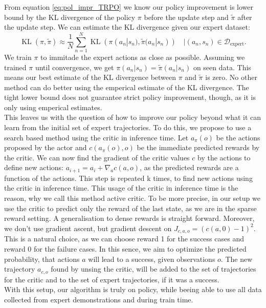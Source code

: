 From equation \ref{eq:pol_impr_TRPO} we know our policy improvement is lower bound by the KL divergence of the policy $\pi$ before the update step and 
$\tilde{\pi}$ after the update step. We can estimate the KL divergence given our expert dataset:
\begin{equation*}  
    {\operatorname{KL}} (\pi,\tilde{\pi}) \approx \frac{1}{N} \sum_{n=1}^N {\operatorname{KL}} (\pi(a_n|s_n),\tilde{\pi}(a_n|s_n)) \quad |(a_n,s_n) \in \mathcal{D}_{\text{expert}}.
\end{equation*}  
We train $\pi$ to immitade the expert actions as close as possible. Assuming we trained $\pi$ until convergence, we get $\pi(a_n|s_n) = \tilde{\pi}(a_n|s_n)$ on seen 
data. This means our best estimate of the KL divergence between $\pi$ and $\tilde{\pi}$ is zero. No other method can do better using the emperical 
estimate of the KL divergence. The tight lower bound does not guarantee strict policy improvement, though, as it is only using emperical estimates.
\\
This leaves us with the question of how to improve our policy beyond what it can learn from the initial set of expert trajectories. To do this, we propose to use 
a search based method using the critic in inference time. Let $a_{\pi}(o)$ be the actions proposed by the actor and $c(a_{\pi}(o), o)$ be the immediate predicted rewards by the critic. 
We can now find the gradient of the critic values $c$ by the actions to define new actions: $a_{i+1} = a_i + \nabla_{a}c(a, o)$, as the predicted rewards are a 
function of the actions. This step is repeated k times, to find new actions using the critic in inference time. This usage of the critic in inference time 
is the reason, why we call this method active critic. To be more precise, in our setup we use the critic to predict only the reward of the last state, as we are 
in the sparse reward setting. A generalisation to dense rewards is straight forward. Moreover, we don't use gradient ascent, but gradient descent on 
$J_{c, a, o} = (c(a, 0) - 1)^2$. This is a natural choice, as we can 
choose reward 1 for the success cases and reward 0 for the failure cases. In this sence, we aim to optimize the predicted probability, that actions $a$ will lead 
to a success, given observations $o$. The new trajectory $a_{c, o}$ found by unsing the critic, will 
be added to the set of trajectories for the critic and to the set of expert trajectories, if it was a success. \\
With this setup, our algorithm is truly on policy, while beeing able to use all data collected from expert demonstrations and during train time. 

